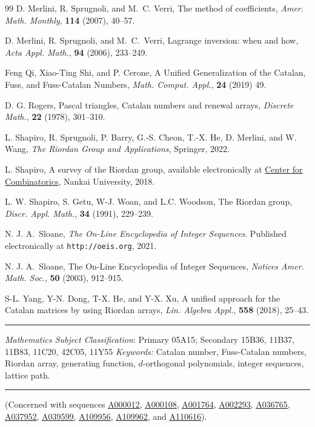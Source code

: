 \documentclass[12pt,reqno]{article}
\theoremstyle{definition}
\newcommand{\seqnum}[1]{\href{http://oeis.org/#1}{\underline{#1}}}
\begin{document}
\begin{thebibliography}{99}
 D. Merlini, R. Sprugnoli, and M.~C. Verri, The method of coefficients, \emph{Amer. Math. Monthly}, \textbf{114} (2007), 40--57.

 D. Merlini, R. Sprugnoli, and M.~C.~Verri, Lagrange inversion: when and how, \emph{Acta Appl. Math.}, \textbf{94} (2006),  233--249.

 Feng Qi, Xiao-Ting Shi, and P. Cerone, A Unified Generalization of the Catalan, Fuss, and Fuss-Catalan Numbers, \emph{Math. Comput. Appl.}, \textbf{24} (2019) 49.

 D. G. Rogers, Pascal triangles, Catalan numbers and renewal arrays, \emph{Discrete Math.}, \textbf{22} (1978), 301--310.

 L. Shapiro, R. Sprugnoli, P. Barry, G.-S. Cheon, T.-X. He, D. Merlini, and W. Wang, \emph{The Riordan Group and Applications}, Springer, 2022.

 L. Shapiro, A survey of the Riordan group, available electronically at
\href{http://www.combinatorics.cn/activities/Riordan\%20Group.pdf} {Center for Combinatorics}, Nankai University, 2018.

 L. W. Shapiro, S. Getu, W-J. Woan, and L.C. Woodson,
The Riordan group, \emph{Discr. Appl. Math.}, \textbf{34} (1991),
 229--239.

 N. J. A.~Sloane, \emph{The
On-Line Encyclopedia of Integer Sequences}. Published electronically
at \texttt{http://oeis.org}, 2021.

 N. J. A.~Sloane, The On-Line Encyclopedia of Integer
Sequences, \emph{Notices Amer. Math. Soc.}, \textbf{50} (2003),  912--915.

 S-L. Yang, Y-N. Dong, T-X. He, and Y-X. Xu, A unified approach for the Catalan matrices by using Riordan arrays, \emph{Lin. Algebra Appl.}, \textbf{558} (2018), 25--43.


\end{thebibliography}

\bigskip
\hrule

 {\it Mathematics Subject Classification}:
Primary 05A15; Secondary 15B36, 11B37, 11B83, 11C20, 42C05, 11Y55
\noindent \emph{Keywords:} Catalan number, Fuss-Catalan numbers, Riordan array, generating function, $d$-orthogonal polynomials, integer sequences, lattice path.

\bigskip
\hrule
\bigskip
\noindent (Concerned with sequences
\seqnum{A000012},
\seqnum{A000108},
\seqnum{A001764},
\seqnum{A002293},
\seqnum{A036765},
\seqnum{A037952},
\seqnum{A039599},
\seqnum{A109956},
\seqnum{A109962}, and
\seqnum{A110616}).
\end{document}
